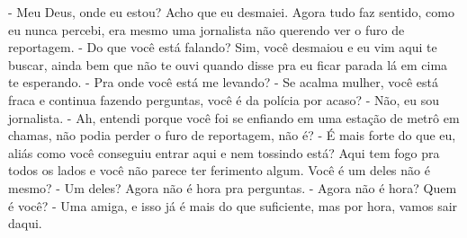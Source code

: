 
- Meu Deus, onde eu estou? Acho que eu desmaiei. Agora tudo faz sentido, como eu nunca percebi, era mesmo uma jornalista não querendo ver o furo de reportagem.
- Do que você está falando? Sim, você desmaiou e eu vim aqui te buscar, ainda bem que não te ouvi quando disse pra eu ficar parada lá em cima te esperando.
- Pra onde você está me levando?
- Se acalma mulher, você está fraca e continua fazendo perguntas, você é da polícia por acaso?
- Não, eu sou jornalista.
- Ah, entendi porque você foi se enfiando em uma estação de metrô em chamas, não podia perder o furo de reportagem, não é?
- É mais forte do que eu, aliás como você conseguiu entrar aqui e nem tossindo está? Aqui tem fogo pra todos os lados e você não parece ter ferimento algum. Você é um deles não é mesmo?
- Um deles? Agora não é hora pra perguntas.
- Agora não é hora? Quem é você?
- Uma amiga, e isso já é mais do que suficiente, mas por hora, vamos sair daqui.